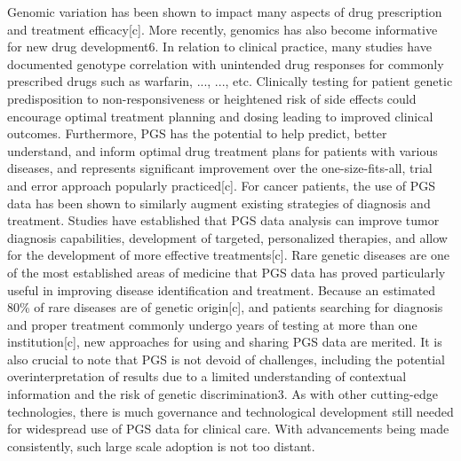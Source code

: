 \documentclass{article}
\begin{document}
Genomic variation has been shown to impact many aspects of drug prescription and treatment efficacy[c]. More recently, genomics has also become informative for new drug development6. In relation to clinical practice, many studies have documented genotype correlation with unintended drug responses for commonly prescribed drugs such as warfarin, ..., ..., etc. Clinically testing for patient genetic predisposition to non-responsiveness or heightened risk of side effects could encourage optimal treatment planning and dosing leading to improved clinical outcomes. Furthermore, PGS has the potential to help predict, better understand, and inform optimal drug treatment plans for patients with various diseases, and represents significant improvement over the one-size-fits-all, trial and error approach popularly practiced[c]. For cancer patients, the use of PGS data has been shown to similarly augment existing strategies of diagnosis and treatment. Studies have established that PGS data analysis can improve tumor diagnosis capabilities, development of targeted, personalized therapies, and allow for the development of more effective treatments[c]. Rare genetic diseases are one of the most established areas of medicine that PGS data has proved particularly useful in improving disease identification and treatment. Because an estimated 80\% of rare diseases are of genetic origin[c], and patients searching for diagnosis and proper treatment commonly undergo years of testing at more than one institution[c], new approaches for using and sharing PGS data are merited. It is also crucial to note that PGS is not devoid of challenges, including the potential overinterpretation of results due to a limited understanding of contextual information and the risk of genetic discrimination3. As with other cutting-edge technologies, there is much governance and technological development still needed for widespread use of PGS data for clinical care. With advancements being made consistently, such large scale adoption is not too distant.
\end{document}
